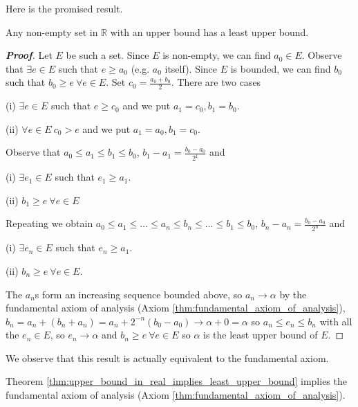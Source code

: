 Here is the promised result.

\begin{theorem}\label{thm:upper_bound_in_real_implies_least_upper_bound}%
Any non-empty set in $\mathbb{R}$ with an upper bound has a least upper bound.
\end{theorem}

\begin{proof}[\bf Proof]
Let $E$ be such a set. Since $E$ is non-empty, we can find $a_0 \in E$. Observe that $\exists e \in E$ such that $e \geq a_0$ (e.g. $a_0$ itself). Since $E$ is bounded, we can find $b_0$ such that $b_0 \geq e \ \forall e \in E$. Set $c_0 = \frac{a_0 + b_0}{2}$. There are two cases
\ben
\item [(i)] $\exists e \in E$ such that $e \geq c_0$ and we put $a_1 = c_0, b_1 = b_0$.
\item [(ii)] $\forall e \in E \ c_0 > e$ and we put $a_1 = a_0, b_1 = c_0$.
\een

Observe that $a_0 \leq a_1 \leq b_1 \leq b_0$, $b_1 - a_1 = \frac{b_0 - a_0}{2^1}$ and
\ben
\item [(i)] $\exists e_1 \in E$ such that $e_1 \geq a_1$.
\item [(ii)] $b_1 \geq e \ \forall e \in E$
\een

Repeating we obtain $a_0 \leq a_1  \leq \ldots \leq a_n \leq b_n \leq \ldots \leq b_1 \leq b_0$, $b_n - a_n = \frac{b_0 - a_0}{2^n}$ and
\ben
\item [(i)] $\exists e_n \in E$ such that $e_n \geq a_1$.
\item [(ii)] $b_n \geq e \ \forall e \in E$.
\een

The $a_n$s form an increasing sequence bounded above, so $a_n \rightarrow \alpha$ by the fundamental axiom of analysis (Axiom \ref{thm:fundamental_axiom_of_analysis}), $b_n = a_n + (b_n + a_n) = a_n + 2^{-n} (b_0 - a_0) \rightarrow \alpha + 0 = \alpha$ so $a_n \leq e_n \leq b_n$ with all the $e_n \in E$, so $e_n \rightarrow \alpha$ and $b_n \geq e \ \forall e \in E$ so $\alpha$ is the least upper bound of $E$.
\end{proof}


We observe that this result is actually equivalent to the fundamental axiom.

\begin{theorem}\label{thm:least_upper_bound_existence_implies_fundamental_axiom_of_analysis}
Theorem \ref{thm:upper_bound_in_real_implies_least_upper_bound} implies the fundamental axiom of analysis (Axiom \ref{thm:fundamental_axiom_of_analysis}).
\end{theorem}

